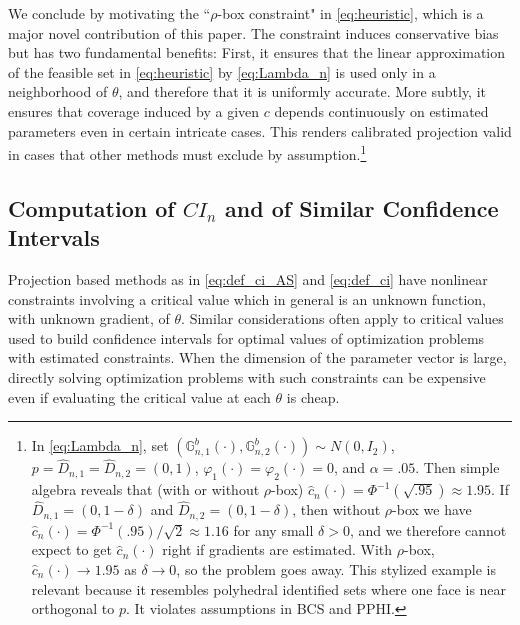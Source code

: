 \documentclass[letterpaper,11pt]{article}
\theoremstyle{myplain}
\theoremstyle{mydefinition}
\theoremstyle{myremark}
\numberwithin{equation}{section}
\numberwithin{figure}{section}
\begin{document}
We conclude by motivating the ``$\rho$-box constraint" in \eqref{eq:heuristic}, which is a major novel contribution of this paper. The constraint induces conservative bias but has two fundamental benefits: First, it ensures that the linear approximation of the feasible set in \eqref{eq:heuristic} by \eqref{eq:Lambda_n} is used only in a neighborhood of $\theta$, and therefore that it is uniformly accurate. More subtly, it ensures that coverage induced by a given $c$ depends continuously on estimated parameters even in certain intricate cases. This renders calibrated projection valid in cases that other methods must exclude by assumption.\footnote{In \eqref{eq:Lambda_n}, set $(\mathbb{G}_{n,1}^b(\cdot),\mathbb{G}_{n,2}^b(\cdot))\sim N(0,I_2)$, $p=\hat{D}_{n,1}=\hat{D}_{n,2}=(0,1)$, $\varphi_1(\cdot)=\varphi_2(\cdot)=0$, and $\alpha=.05$. Then simple algebra reveals that (with or without $\rho$-box) $\hat{c}_n(\cdot)=\Phi^{-1}(\sqrt{.95}) \approx 1.95$. If $\hat{D}_{n,1}=(0,1-\delta)$ and $\hat{D}_{n,2}=(0,1-\delta)$, then without $\rho$-box we have $\hat{c}_n(\cdot)=\Phi^{-1}(.95)/\sqrt{2}\approx 1.16$ for any small $\delta>0$, and we therefore cannot expect to get $\hat{c}_n(\cdot)$ right if gradients are estimated. With $\rho$-box, $\hat{c}_n(\cdot) \to 1.95$ as $\delta \to 0$, so the problem goes away. This stylized example is relevant because it resembles polyhedral identified sets where one face is near orthogonal to $p$. It violates assumptions in BCS and PPHI.}


\subsection{Computation of $CI_n$ and of Similar Confidence Intervals}
\label{sec:Computation}
Projection based methods as in \eqref{eq:def_ci_AS} and \eqref{eq:def_ci} have nonlinear constraints involving a critical value which in general is an unknown function, with unknown gradient, of $\theta$.
Similar considerations often apply to critical values used to build confidence intervals for optimal values of optimization problems with estimated constraints.
When the dimension of the parameter vector is large, directly solving optimization problems with such constraints can be expensive even if evaluating the critical value at each $\theta$ is cheap.
\end{document}
